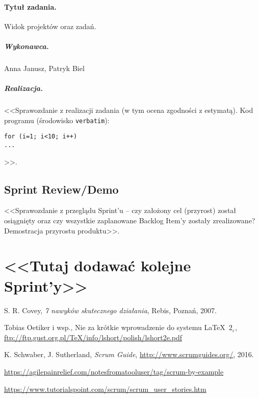 \documentclass[a4paper]{article}
\begin{document}
\paragraph{Tytuł zadania.} Widok projektów oraz zadań.
\subparagraph{Wykonawca.} Anna Janusz, Patryk Biel
\subparagraph{Realizacja.} <<Sprawozdanie z realizacji zadania (w tym ocena zgodności z estymatą). Kod programu (środowisko \texttt{verbatim}): \begin{verbatim}
for (i=1; i<10; i++)
...
\end{verbatim}>>.


\subsection{Sprint Review/Demo}
<<Sprawozdanie z przeglądu Sprint'u -- czy założony cel (przyrost) został osiągnięty oraz czy wszystkie zaplanowane Backlog Item'y zostały zrealizowane? Demostracja przyrostu produktu>>.

\section*{<<Tutaj dodawać kolejne Sprint'y>>}


\begin{thebibliography}{9}

 S. R. Covey, {\em 7 nawyków skutecznego działania}, Rebis, Poznań, 2007.

 Tobias Oetiker i wsp., Nie za krótkie wprowadzenie do systemu \LaTeX  \ $2_\varepsilon$, \url{ftp://ftp.gust.org.pl/TeX/info/lshort/polish/lshort2e.pdf}

 K. Schwaber, J. Sutherland, {\em Scrum Guide}, \url{http://www.scrumguides.org/}, 2016.

 \url{https://agilepainrelief.com/notesfromatooluser/tag/scrum-by-example}

 \url{https://www.tutorialspoint.com/scrum/scrum_user_stories.htm}

\end{thebibliography}
\end{document}
